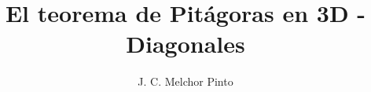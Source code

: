 \documentclass[12pt]{guia}
\title{El teorema de Pitágoras en 3D - Diagonales}
\author{J. C. Melchor Pinto}
\begin{document}
\pagestyle{headandfoot}
\addpoints
\INFO
\printanswers

\newpage
\begin{questions}
    \questionboxed[10]  
    \questionboxed[10]  
    \questionboxed[10]  
    \questionboxed[10]  
    \questionboxed[10]  
\end{questions}
\end{document}
